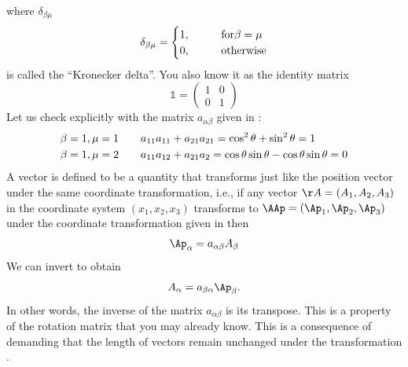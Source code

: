 \documentclass{tufte-book} %
\begin{document}
\begin{subappendices}
where $\delta_{\beta\mu}$
\begin{equation}
\delta_{\beta\mu} =
\begin{cases} 1 \/, & \quad\quad {\rm for} \beta = \mu \\
  0 \/,& \quad\quad {\rm otherwise}
\end{cases}
\end{equation}
is called the ``Kronecker delta''. You also know it as the identity matrix
\begin{equation}
\mathbb{1} = 
\begin{pmatrix}
1 & 0 \\
0 & 1
\end{pmatrix}
\end{equation}
Let us check  explicitly with the matrix $a_{\alpha\beta}$
given in :
\begin{subequations}
\begin{align}
\beta=1\/,\mu=1&\/ \quad\quad a_{11}a_{11} + a_{21}a_{21} =
  \cos^2\theta+\sin^2\theta = 1 \\
\beta=1\/,\mu=2&\/ \quad\quad a_{11}a_{12} + a_{21}a_{2} =
  \cos\theta\sin\theta-\cos\theta\sin\theta = 0 
\end{align}
\end{subequations}
A vector is defined to be a quantity that transforms just like the
position vector under the same coordinate transformation, i.e., if any
vector $\AA= (A_1,A_2,A_3)$ in the coordinate system $(x_1,x_2,x_3)$
transforms to $\AAp = (\Ap_1,\Ap_2,\Ap_3)$ under the coordinate
transformation given in  then 
\begin{equation}
\Ap_{\alpha} = a_{\alpha\beta} A_{\beta}
\label{eq:Ap}
\end{equation}
We can invert  to obtain
\begin{equation} 
 A_{\alpha} = a_{\beta\alpha}\Ap_{\beta} \/.
\label{eq:invert}
\end{equation}
In other words, the inverse of the matrix $a_{\alpha\beta}$ is its
transpose. This is a property of the rotation matrix that you may
already know. This is a consequence of demanding that the length of
vectors remain unchanged under the transformation . 


\end{subappendices}
\end{document}

